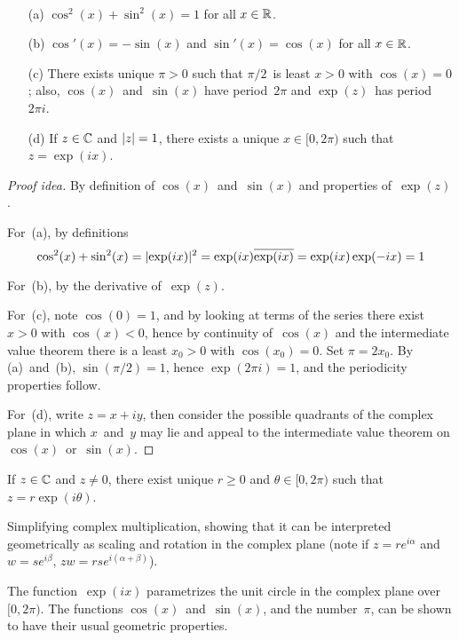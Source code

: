 \begin{thm}
\ 
\begin{enumerate}[itemsep=0pt]
\item[(a)] \(\cos^2(x)+\sin^2(x)=1\) for all \(x\in\mathbb{R}\).
\item[(b)] \(\cos'(x)=-\sin(x)\) and \(\sin'(x)=\cos(x)\) for all \(x\in\mathbb{R}\).
\item[(c)] There exists unique \(\pi>0\) such that \(\pi/2\)~is least \(x>0\) with \(\cos(x)=0\); also, \(\cos(x)\)~and~\(\sin(x)\) have period~\(2\pi\) and \(\exp(z)\)~has period~\(2\pi i\).
\item[(d)] If \(z\in\mathbb{C}\) and \(|{z}|=1\), there exists a unique \(x\in[0,2\pi)\) such that \(z=\exp(ix)\).
\end{enumerate}
\end{thm}
\begin{proof}[Proof idea]
By definition of \(\cos(x)\)~and~\(\sin(x)\) and properties of~\(\exp(z)\).

For~(a), by definitions
\[\cos^2(x)+\sin^2(x)=|{\exp(ix)}|^2=\exp(ix)\overline{\exp(ix)}=\exp(ix)\exp(-ix)=1\]

For~(b), by the derivative of~\(\exp(z)\).

For~(c), note \(\cos(0)=1\), and by looking at terms of the series there exist \(x>0\) with \(\cos(x)<0\), hence by continuity of~\(\cos(x)\) and the intermediate value theorem there is a least \(x_0>0\) with \(\cos(x_0)=0\). Set \(\pi=2x_0\). By (a)~and~(b), \(\sin(\pi/2)=1\), hence \(\exp(2\pi i)=1\), and the periodicity properties follow.

For~(d), write \(z=x+iy\), then consider the possible quadrants of the complex plane in which \(x\)~and~\(y\) may lie and appeal to the intermediate value theorem on \(\cos(x)\)~or~\(\sin(x)\).
\end{proof}
\begin{cor}
If \(z\in\mathbb{C}\) and \(z\ne0\), there exist unique \(r\ge0\) and \(\theta\in[0,2\pi)\) such that \(z=r\exp(i\theta)\).
\end{cor}
\begin{app}
Simplifying complex multiplication, showing that it can be interpreted geometrically as scaling and rotation in the complex plane (note if \(z=re^{i\alpha}\) and \(w=se^{i\beta}\), \(zw=rse^{i(\alpha+\beta)}\)).
\end{app}
\begin{rmk}
The function~\(\exp(ix)\) parametrizes the unit circle in the complex plane over \([0,2\pi)\). The functions \(\cos(x)\)~and~\(\sin(x)\), and the number~\(\pi\), can be shown to have their usual geometric properties.
\end{rmk}

